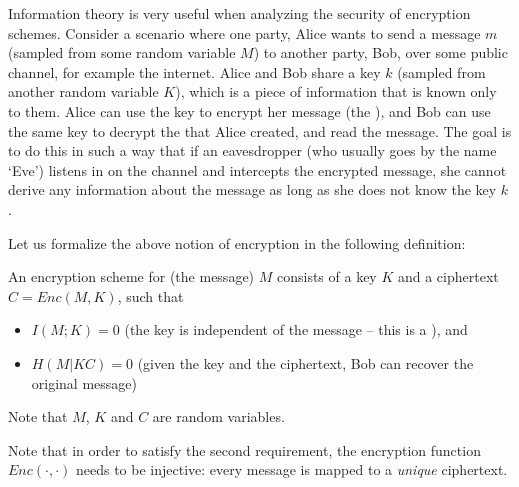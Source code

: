 Information theory is very useful when analyzing the security of encryption schemes. Consider a scenario where one party, Alice wants to send a message $m$ (sampled from some random variable $M$) to another party, Bob, over some public channel, for example the internet. Alice and Bob share a key $k$ (sampled from another random variable $K$), which is a piece of information that is known only to them. Alice can use the key to encrypt her message (the ), and Bob can use the same key to decrypt the  that Alice created, and read the message. The goal is to do this in such a way that if an eavesdropper (who usually goes by the name `Eve') listens in on the channel and intercepts the encrypted message, she cannot derive any information about the message as long as she does not know the key $k$.

\begin{center}
\end{center}

Let us formalize the above notion of encryption in the following definition:
\begin{definition}\label{def:encryption}
An encryption scheme for (the message) $M$ consists of a key $K$ and a ciphertext $C = Enc(M,K)$, such that
\begin{itemize}
\item $I(M;K) = 0$ (the key is independent of the message -- this is a ), and
\item $H(M|KC) = 0$ (given the key and the ciphertext, Bob can recover the original message)
\end{itemize}
Note that $M$, $K$ and $C$ are random variables.
\end{definition}
Note that in order to satisfy the second requirement, the encryption function $Enc(\cdot,\cdot)$ needs to be injective: every message is mapped to a \emph{unique} ciphertext.


